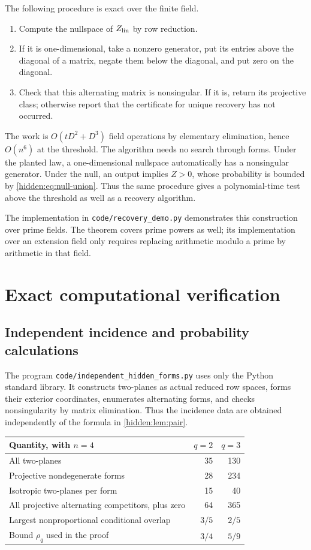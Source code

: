 \documentclass[11pt,a4paper]{article}
\theoremstyle{remark}
\begin{document}
The following procedure is exact over the finite field.
\begin{enumerate}
\item Compute the nullspace of $Z_{\rm lin}$ by row reduction.
\item If it is one-dimensional, take a nonzero generator, put its entries above the diagonal of a matrix, negate them below the diagonal, and put zero on the diagonal.
\item Check that this alternating matrix is nonsingular. If it is, return its projective class; otherwise report that the certificate for unique recovery has not occurred.
\end{enumerate}
The work is $O(tD^2+D^3)$ field operations by elementary elimination, hence $O(n^6)$ at the threshold. The algorithm needs no search through forms. Under the planted law, a one-dimensional nullspace automatically has a nonsingular generator. Under the null, an output implies $Z>0$, whose probability is bounded by \eqref{hidden:eq:null-union}. Thus the same procedure gives a polynomial-time test above the threshold as well as a recovery algorithm.

The implementation in \texttt{code/recovery\_demo.py} demonstrates this construction over prime fields. The theorem covers prime powers as well; its implementation over an extension field only requires replacing arithmetic modulo a prime by arithmetic in that field.

\section{Exact computational verification}

\subsection{Independent incidence and probability calculations}

The program \texttt{code/independent\_hidden\_forms.py} uses only the Python standard library. It constructs two-planes as actual reduced row spaces, forms their exterior coordinates, enumerates alternating forms, and checks nonsingularity by matrix elimination. Thus the incidence data are obtained independently of the formula in \cref{hidden:lem:pair}.

\begin{center}
\begin{tabular}{lrr}
\toprule
Quantity, with $n=4$ & $q=2$ & $q=3$\\
\midrule
All two-planes & 35 & 130\\
Projective nondegenerate forms & 28 & 234\\
Isotropic two-planes per form & 15 & 40\\
All projective alternating competitors, plus zero & 64 & 365\\
Largest nonproportional conditional overlap & $3/5$ & $2/5$\\
Bound $\rho_q$ used in the proof & $3/4$ & $5/9$\\
\bottomrule
\end{tabular}
\end{center}
\end{document}
